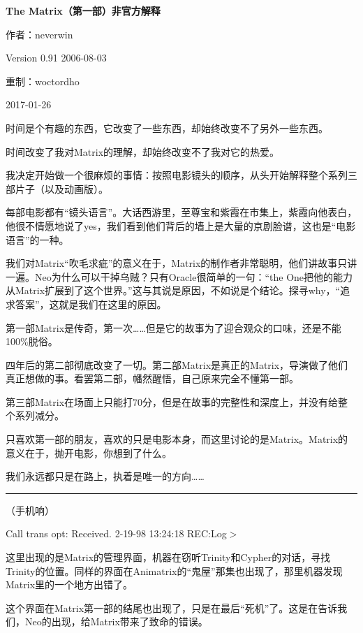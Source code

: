 \documentclass{ctexart}
\newcommand{\myparsep}{\noindent \rule[0.5ex]{\linewidth}{1pt}}
\newenvironment{myquote}{\color{green} \setlength{\leftskip}{6em} \setlength{\rightskip}{4em} \setlength{\parindent}{-2em}}{\par}
\begin{document}
\centerline{\bf \fontsize{15.75pt} \baselineskip \selectfont The Matrix（第一部）非官方解释}
\vspace{12pt}
\centerline{作者：neverwin}
\centerline{Version 0.91 2006-08-03}
\centerline{重制：woctordho}
\centerline{2017-01-26}
\vspace{12pt}

时间是个有趣的东西，它改变了一些东西，却始终改变不了另外一些东西。

时间改变了我对Matrix的理解，却始终改变不了我对它的热爱。

我决定开始做一个很麻烦的事情：按照电影镜头的顺序，从头开始解释整个系列三部片子（以及动画版）。

每部电影都有“镜头语言”。大话西游里，至尊宝和紫霞在市集上，紫霞向他表白，他很不情愿地说了yes，我们看到他们背后的墙上是大量的京剧脸谱，这也是“电影语言”的一种。

我们对Matrix“吹毛求疵”的意义在于，Matrix的制作者非常聪明，他们讲故事只讲一遍。Neo为什么可以干掉乌贼？只有Oracle很简单的一句：“the One把他的能力从Matrix扩展到了这个世界。”这与其说是原因，不如说是个结论。探寻why，“追求答案”，这就是我们在这里的原因。

第一部Matrix是传奇，第一次……但是它的故事为了迎合观众的口味，还是不能100\%脱俗。

四年后的第二部彻底改变了一切。第二部Matrix是真正的Matrix，导演做了他们真正想做的事。看罢第二部，幡然醒悟，自己原来完全不懂第一部。

第三部Matrix在场面上只能打70分，但是在故事的完整性和深度上，并没有给整个系列减分。

只喜欢第一部的朋友，喜欢的只是电影本身，而这里讨论的是Matrix。Matrix的意义在于，抛开电影，你想到了什么。

我们永远都只是在路上，执着是唯一的方向……

\myparsep

\begin{myquote}
（手机响）

Call trans opt: Received. 2-19-98 13:24:18 REC:Log$>$
\end{myquote}

这里出现的是Matrix的管理界面，机器在窃听Trinity和Cypher的对话，寻找Trinity的位置。同样的界面在Animatrix的“鬼屋”那集也出现了，那里机器发现Matrix里的一个地方出错了。

这个界面在Matrix第一部的结尾也出现了，只是在最后“死机”了。这是在告诉我们，Neo的出现，给Matrix带来了致命的错误。
\end{document}
